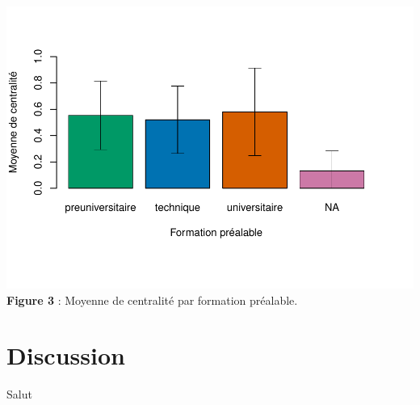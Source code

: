 \documentclass[preprint, 3p,
authoryear]{elsarticle} %
\begin{document}
\includegraphics{rapport_files/figure-latex/unnamed-chunk-3-1.pdf}
\textbf{Figure 3} : Moyenne de centralité par formation préalable.

\hypertarget{discussion}{%
\section{Discussion}\label{discussion}}

Salut

\renewcommand\refname{References}

\end{document}
